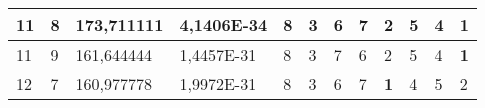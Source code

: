 \documentclass[conference]{IEEEtran}
\begin{document}
\begin{table*}[]
\begin{tabular}{|llll|llllllll|}
\multicolumn{1}{|l|}{11}                                                    & \multicolumn{1}{l|}{8}                                                        & \multicolumn{1}{l|}{173,711111}                                                   & 4,1406E-34                     & \multicolumn{1}{l|}{8}                                                  & \multicolumn{1}{l|}{3}                                                  & \multicolumn{1}{l|}{6}                                                  & \multicolumn{1}{l|}{7}                                                  & \multicolumn{1}{l|}{2}                                                  & \multicolumn{1}{l|}{5}                                                  & \multicolumn{1}{l|}{4}                                                  & \textbf{1}                 \\ \hline
\multicolumn{1}{|l|}{11}                                                    & \multicolumn{1}{l|}{9}                                                        & \multicolumn{1}{l|}{161,644444}                                                   & 1,4457E-31                     & \multicolumn{1}{l|}{8}                                                  & \multicolumn{1}{l|}{3}                                                  & \multicolumn{1}{l|}{7}                                                  & \multicolumn{1}{l|}{6}                                                  & \multicolumn{1}{l|}{2}                                                  & \multicolumn{1}{l|}{5}                                                  & \multicolumn{1}{l|}{4}                                                  & \textbf{1}                 \\ \hline
\multicolumn{1}{|l|}{12}                                                    & \multicolumn{1}{l|}{7}                                                        & \multicolumn{1}{l|}{160,977778}                                                   & 1,9972E-31                     & \multicolumn{1}{l|}{8}                                                  & \multicolumn{1}{l|}{3}                                                  & \multicolumn{1}{l|}{6}                                                  & \multicolumn{1}{l|}{7}                                                  & \multicolumn{1}{l|}{\textbf{1}}                                         & \multicolumn{1}{l|}{4}                                                  & \multicolumn{1}{l|}{5}                                                  & 2                          \\ \hline

\end{tabular}
\end{table*}
\end{document}
